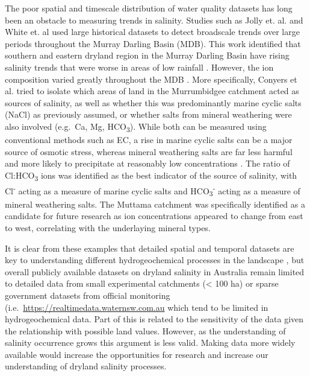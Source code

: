 \documentclass[, manuscript]{copernicus}
\begin{document}
The poor spatial and timescale distribution of water quality datasets
has long been an obstacle to measuring trends in salinity. Studies such
as Jolly et. al. \citeyearpar{Jolly2001} and White et. al
\citeyearpar{White2009} used large historical datasets to detect
broadscale trends over large periods throughout the Murray Darling Basin
(MDB). This work identified that southern and eastern dryland region in
the Murray Darling Basin have rising salinity trends that were worse in
areas of low rainfall \citep{White2009, Jolly2001}. However, the ion
composition varied greatly throughout the MDB \citep{White2009}. More
specifically, Conyers et al. \citeyearpar{Conyers2008} tried to isolate
which areas of land in the Murrumbidgee catchment acted as sources of
salinity, as well as whether this was predominantly marine cyclic salts
(NaCl) as previously assumed, or whether salts from mineral weathering
were also involved (e.g.~Ca, Mg, HCO\textsubscript{3}). While both can
be measured using conventional methods such as EC, a rise in marine
cyclic salts can be a major source of osmotic stress, whereas mineral
weathering salts are far less harmful and more likely to precipitate at
reasonably low concentrations \citep{Conyers2008}. The ratio of
Cl:HCO\textsubscript{3} ions was identified as the best indicator of the
source of salinity, with Cl\textsuperscript{-} acting as a measure of
marine cyclic salts and HCO\textsubscript{3}\textsuperscript{-} acting
as a measure of mineral weathering salts. The Muttama catchment was
specifically identified as a candidate for future research as ion
concentrations appeared to change from east to west, correlating with
the underlaying mineral types.

It is clear from these examples that detailed spatial and temporal
datasets are key to understanding different hydrogeochemical processes
in the landscape \citep[e.g.][]{Cartwright2010, Dalhaus2010}, but
overall publicly available datasets on dryland salinity in Australia
remain limited to detailed data from small experimental catchments
(\textless{} 100 ha) \citep{Summerell2006, Hughes2007} or sparse
government datasets from official monitoring
(i.e.~\url{https://realtimedata.waternsw.com.au} which tend to be
limited in hydrogeochemical data. Part of this is related to the
sensitivity of the data given the relationship with possible land
values. However, as the understanding of salinity occurrence grows this
argument is less valid. Making data more widely available would increase
the opportunities for research and increase our understanding of dryland
salinity processes.
\end{document}
